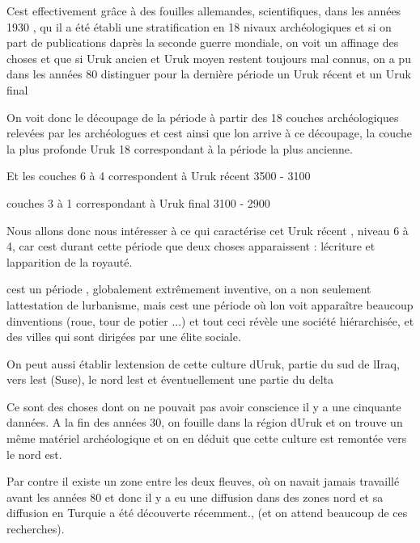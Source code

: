 \documentclass{article}
\begin{document}
C{\textquotesingle}est effectivement grâce à des fouilles allemandes,
scientifiques, dans les années 1930 , qu{\textquotesingle} il a été
établi une stratification en 18 nivaux archéologiques et si on part de
publications d{\textquotesingle}après la seconde guerre mondiale, on
voit un affinage des choses et que si Uruk ancien et Uruk moyen restent
toujours mal connus, on a pu dans les années 80 distinguer pour la
dernière période un Uruk récent et un Uruk final

On voit donc le découpage de la période à partir des 18 couches
archéologiques relevées par les archéologues et c{\textquotesingle}est 
ainsi que l{\textquotesingle}on arrive à ce découpage, la couche la
plus profonde  Uruk 18 correspondant à la période la plus ancienne.

Et les couches 6 à 4 correspondent à Uruk récent  3500 - 3100

couches 3 à 1 correspondant à Uruk final 3100 - 2900 

Nous allons donc nous intéresser à ce qui caractérise cet Uruk récent ,
niveau 6 à 4, car c{\textquotesingle}est durant cette période que deux
choses apparaissent :  l{\textquotesingle}écriture et
l{\textquotesingle}apparition de la royauté.

c{\textquotesingle}est un période , globalement extrêmement inventive,
on a non seulement l{\textquotesingle}attestation de
l{\textquotesingle}urbanisme, mais c{\textquotesingle}est une période
où l{\textquotesingle}on voit apparaître beaucoup
d{\textquotesingle}inventions (roue, tour de potier ...) et tout ceci
révèle une société hiérarchisée, et des villes qui sont dirigées par
une élite sociale.

On peut aussi établir l{\textquotesingle}extension de cette culture
d{\textquotesingle}Uruk, partie du sud de l{\textquotesingle}Iraq, vers
l{\textquotesingle}est (Suse), le nord l{\textquotesingle}est et
éventuellement une partie du delta

Ce sont des choses dont on ne pouvait pas avoir conscience il y a une
cinquante d{\textquotesingle}années. A la fin des années 30, on fouille
dans la région d{\textquotesingle}Uruk et on trouve un même matériel
archéologique et on en déduit que cette culture est remontée vers le
nord est. 

Par contre il existe un zone entre les deux fleuves, où on
n{\textquotesingle}avait jamais travaillé avant les années 80 et donc
il y a eu une diffusion dans des zones nord et sa diffusion en Turquie
a été découverte récemment., (et on attend beaucoup de ces recherches).
\end{document}
